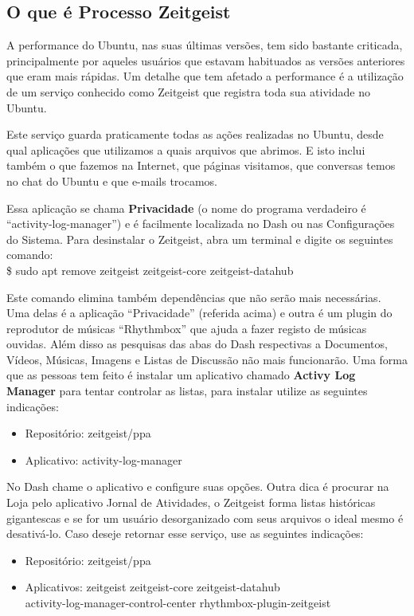 \subsection{O que é Processo Zeitgeist}
A performance do Ubuntu, nas suas últimas versões, tem sido bastante criticada, principalmente por aqueles usuários que estavam habituados as versões anteriores que eram mais rápidas. Um detalhe que tem afetado a performance é a utilização de um serviço conhecido como Zeitgeist que registra toda sua atividade no Ubuntu.

Este serviço guarda praticamente todas as ações realizadas no Ubuntu, desde qual aplicações que utilizamos a quais arquivos que abrimos. E isto inclui também o que fazemos na Internet, que páginas visitamos, que conversas temos no chat do Ubuntu e que e-mails trocamos.

Essa aplicação se chama \textbf{Privacidade} (o nome do programa verdadeiro é “activity-log-manager”) e é facilmente localizada no Dash ou nas Configurações do Sistema. Para desinstalar o Zeitgeist, abra um terminal e digite os seguintes comando: \\
{\ttfamily\$ sudo apt remove zeitgeist zeitgeist-core zeitgeist-datahub}

Este comando elimina também dependências que não serão mais necessárias. Uma delas é a aplicação ``Privacidade'' (referida acima) e outra é um plugin do reprodutor de músicas ``Rhythmbox'' que ajuda a fazer registo de músicas ouvidas. Além disso as pesquisas das abas do Dash respectivas a Documentos, Vídeos, Músicas, Imagens e Listas de Discussão não mais funcionarão. Uma forma que as pessoas tem feito é instalar um aplicativo chamado \textbf{Activy Log Manager} para tentar controlar as listas, para instalar utilize as seguintes indicações: \vspace{-1em}
\begin{itemize}[noitemsep]
 \item Repositório: zeitgeist/ppa
 \item Aplicativo: activity-log-manager
\end{itemize} 

No Dash chame o aplicativo e configure suas opções. Outra dica é procurar na Loja pelo aplicativo Jornal de Atividades, o Zeitgeist forma listas históricas gigantescas e se  for um usuário desorganizado com seus arquivos o ideal mesmo é desativá-lo. Caso deseje retornar esse serviço, use as seguintes indicações: \vspace{-1em}
\begin{itemize}[noitemsep]
 \item Repositório: zeitgeist/ppa
 \item Aplicativos: zeitgeist zeitgeist-core zeitgeist-datahub \\ activity-log-manager-control-center rhythmbox-plugin-zeitgeist
\end{itemize} 

